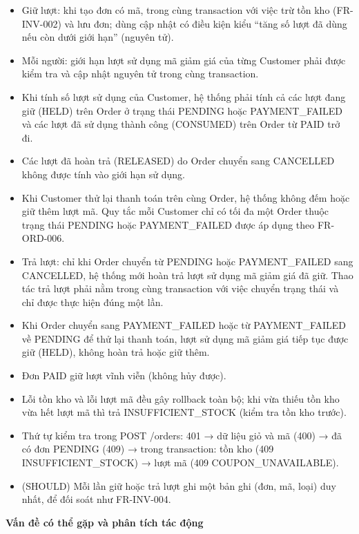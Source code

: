\documentclass[11pt,a4paper,oneside]{report}
\begin{document}
\begin{itemize}
\item
  Giữ lượt: khi tạo đơn có mã, trong cùng transaction với việc trừ tồn kho (FR-INV-002) và lưu đơn; dùng cập nhật có điều kiện kiểu ``tăng số lượt đã dùng nếu còn dưới giới hạn'' (nguyên tử).
\item
  Mỗi người: giới hạn lượt sử dụng mã giảm giá của từng Customer phải được kiểm tra và cập nhật nguyên tử trong cùng transaction.
\item
  Khi tính số lượt sử dụng của Customer, hệ thống phải tính cả các lượt đang giữ (HELD) trên Order ở trạng thái PENDING hoặc PAYMENT\_FAILED và các lượt đã sử dụng thành công (CONSUMED) trên Order từ PAID trở đi.
\item
  Các lượt đã hoàn trả (RELEASED) do Order chuyển sang CANCELLED không được tính vào giới hạn sử dụng.
\item
  Khi Customer thử lại thanh toán trên cùng Order, hệ thống không đếm hoặc giữ thêm lượt mã. Quy tắc mỗi Customer chỉ có tối đa một Order thuộc trạng thái PENDING hoặc PAYMENT\_FAILED được áp dụng theo FR-ORD-006.
\item
  Trả lượt: chỉ khi Order chuyển từ PENDING hoặc PAYMENT\_FAILED sang CANCELLED, hệ thống mới hoàn trả lượt sử dụng mã giảm giá đã giữ. Thao tác trả lượt phải nằm trong cùng transaction với việc chuyển trạng thái và chỉ được thực hiện đúng một lần.
\item
  Khi Order chuyển sang PAYMENT\_FAILED hoặc từ PAYMENT\_FAILED về PENDING để thử lại thanh toán, lượt sử dụng mã giảm giá tiếp tục được giữ (HELD), không hoàn trả hoặc giữ thêm.
\item
  Đơn PAID giữ lượt vĩnh viễn (không hủy được).
\item
  Lỗi tồn kho và lỗi lượt mã đều gây rollback toàn bộ; khi vừa thiếu tồn kho vừa hết lượt mã thì trả INSUFFICIENT\_STOCK (kiểm tra tồn kho trước).
\item
  Thứ tự kiểm tra trong POST /orders: 401 → dữ liệu giỏ và mã (400) → đã có đơn PENDING (409) → trong transaction: tồn kho (409 INSUFFICIENT\_STOCK) → lượt mã (409 COUPON\_UNAVAILABLE).
\item
  (SHOULD) Mỗi lần giữ hoặc trả lượt ghi một bản ghi (đơn, mã, loại) duy nhất, để đối soát như FR-INV-004.
\end{itemize}

\textbf{Vấn đề có thể gặp và phân tích tác động}
\end{document}
